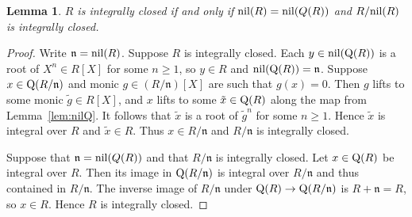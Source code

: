 \documentclass{amsart}
\theoremstyle{plain}
\newtheorem{lemma}[theorem]{Lemma}
\theoremstyle{definition}
\begin{document}
\begin{lemma}\label{lem:integral-closure-iff}
\(R\) is integrally closed if and only if \(\textup{nil}(R)=\textup{nil}(Q(R))\) and \(R/\textup{nil}(R)\) is integrally closed.
\end{lemma}
\begin{proof}
Write \(\mathfrak{n}=\textup{nil}(R)\).
Suppose \(R\) is integrally closed.
Each \(y\in \textup{nil}(\textup{Q}(R))\) is a root of \(X^n\in R[X]\) for some \(n\geq 1\), so \(y\in R\) and \(\textup{nil}(\textup{Q}(R))=\mathfrak{n}\).
Suppose \(x\in\textup{Q}(R/\mathfrak{n})\) and monic \(g\in (R/\mathfrak{n})[X]\) are such that \(g(x)=0\).
Then \(g\) lifts to some monic \(\tilde{g}\in R[X]\), and \(x\) lifts to some \(\tilde{x}\in\textup{Q}(R)\) along the map from Lemma~\ref{lem:nilQ}.
It follows that \(\tilde{x}\) is a root of \(\tilde{g}^n\) for some \(n\geq 1\). 
Hence \(\tilde{x}\) is integral over \(R\) and \(\tilde{x}\in R\). Thus \(x\in R/\mathfrak{n}\) and \(R/\mathfrak{n}\) is integrally closed.

Suppose that \(\mathfrak{n}=\textup{nil}(Q(R))\) and that \(R/\mathfrak{n}\) is integrally closed.
Let \(x\in\textup{Q}(R)\) be integral over \(R\). Then its image in \(\textup{Q}(R/\mathfrak{n})\) is integral over \(R/\mathfrak{n}\) and thus contained in \(R/\mathfrak{n}\).
The inverse image of \(R/\mathfrak{n}\) under \(\textup{Q}(R)\to\textup{Q}(R/\mathfrak{n})\) is \(R+\mathfrak{n}=R\), so \(x\in R\). Hence \(R\) is integrally closed.
\end{proof}
\end{document}
